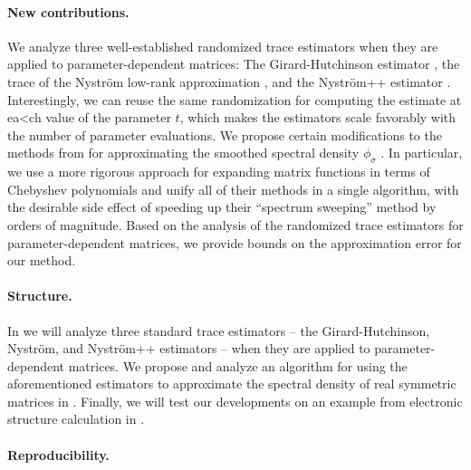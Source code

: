 \paragraph{New contributions.} We analyze three well-established randomized trace estimators when they are applied to parameter-dependent matrices: The Girard-Hutchinson estimator \cite{girard-1989-fast-montecarlo, hutchinson-1990-stochastic-estimator}, the trace of the Nyström low-rank approximation \cite{gittens-2013-revisiting-nystrom}, and the Nyström++ estimator \cite{persson-2022-improved-variants}. Interestingly, we can reuse the same randomization for computing the estimate at ea<ch value of the parameter $t$, which makes the estimators scale favorably with the number of parameter evaluations. We propose certain modifications to the methods from \cite{lin-2017-randomized-estimation} for approximating the smoothed spectral density $\phi_{\sigma}$ . In particular, we use a more rigorous approach for expanding matrix functions in terms of Chebyshev polynomials and unify all of their methods in a single algorithm, with the desirable side effect of speeding up their \enquote{spectrum sweeping} method by orders of magnitude. Based on the analysis of the randomized trace estimators for parameter-dependent matrices, we provide bounds on the approximation error for our method.

\paragraph{Structure.} In  we will analyze three standard trace estimators -- the Girard-Hutchinson, Nyström, and Nyström++ estimators -- when they are applied to parameter-dependent matrices. We propose and analyze an algorithm for using the aforementioned estimators to approximate the spectral density of real symmetric matrices in . Finally, we will test our developments on an example from electronic structure calculation in .

\paragraph{Reproducibility.} 
